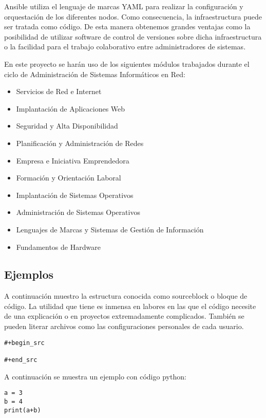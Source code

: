 \documentclass[11pt]{article}
\begin{document}
Ansible utiliza el lenguaje de marcas YAML para realizar la configuración y orquestación de los diferentes nodos. Como consecuencia, la infraestructura puede ser tratada como código. De esta manera obtenemos grandes ventajas como la posibilidad de utilizar software de control de versiones sobre dicha infraestructura o la facilidad para el trabajo colaborativo entre administradores de sistemas.

En este proyecto se harán uso de los siguientes módulos trabajados durante el ciclo de Administración de Sistemas Informáticos en Red:

\begin{itemize}
\item Servicios de Red e Internet
\item Implantación de Aplicaciones Web
\item Seguridad y Alta Disponibilidad
\item Planificación y Administración de Redes
\item Empresa e Iniciativa Emprendedora
\item Formación y Orientación Laboral
\item Implantación de Sistemas Operativos
\item Administración de Sistemas Operativos
\item Lenguajes de Marcas y Sistemas de Gestión de Información
\item Fundamentos de Hardware
\end{itemize}

\subsection{Ejemplos}
\label{sec:orga2b1b03}

A continuación muestro la estructura conocida como sourceblock o bloque de código. La utilidad que tiene es inmensa en labores en las que el código necesite de una explicación o en proyectos extremadamente complicados. También se pueden literar archivos como las configuraciones personales de cada usuario.

\begin{verbatim}
#+begin_src 

#+end_src
\end{verbatim}

A continuación se muestra un ejemplo con código python:

\begin{verbatim}
a = 3
b = 4
print(a+b)
\end{verbatim}
\end{document}

